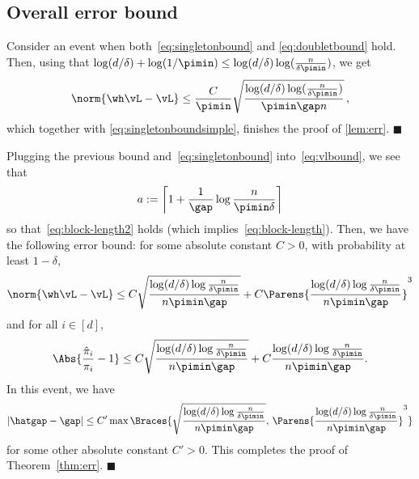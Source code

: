 \subsection{Overall error bound}
Consider an event when both~\eqref{eq:singletonbound} and \eqref{eq:doubletbound} hold.
Then, using that $\log(d/\delta) + \log(1/\pimin) \le \log(d/\delta)\log(\frac{n}{\delta\pimin})$, we get
\begin{align*}
\norm{\wh\vL - \vL} \le 
\frac{C}{\pimin}
\sqrt{
    \frac{\log(d/\delta)\log(\frac{n}{\delta\pimin})}{\pimin\gap n}
  }\,,
\end{align*}
which together with \eqref{eq:singletonboundsimple},
finishes the proof of \cref{lem:err}.
\hfill $\blacksquare$


Plugging the previous bound and~\eqref{eq:singletonbound} into~\eqref{eq:vlbound}, we see that
\[
  a := \left\lceil 1 + \frac{1}{\gap}\log\frac{n}{\pimin\delta} \right\rceil
\]
so that~\eqref{eq:block-length2} holds (which implies~\eqref{eq:block-length}).
Then, we have the following error bound: for some absolute constant
$C>0$, with probability at least $1-\delta$, 
\begin{equation}
  \norm{\wh\vL - \vL}
  \leq
  C
  \sqrt{\frac{\log(d/\delta)\log\frac{n}{\delta\pimin}}{n\pimin\gap}}
  +
  C
  \Parens{
    \frac{\log(d/\delta)\log\frac{n}{\delta\pimin}}{n\pimin\gap}
  }^3
\end{equation}
and for all $i \in [d]$,
\begin{equation}
  \Abs{ \frac{\hat\pi_i}{\pi_i} - 1 }
  \leq 
  C
  \sqrt{\frac{\log(d/\delta)\log\frac{n}{\delta\pimin}}{n\pimin\gap}}
  +
  C
  \frac{\log(d/\delta)\log\frac{n}{\delta\pimin}}{n\pimin\gap}
  .
\end{equation}
In this event, we have
\begin{equation}
  |\hatgap - \gap|
  \leq
  C'
  \max\Braces{
    \sqrt{\frac{\log(d/\delta)\log\frac{n}{\delta\pimin}}{n\pimin\gap}}
    ,\,
    \Parens{
      \frac{\log(d/\delta)\log\frac{n}{\delta\pimin}}{n\pimin\gap}
    }^3
  }
\end{equation}
for some other absolute constant $C'>0$.
This completes the proof of Theorem~\ref{thm:err}.
\hfill $\blacksquare$
\fi


